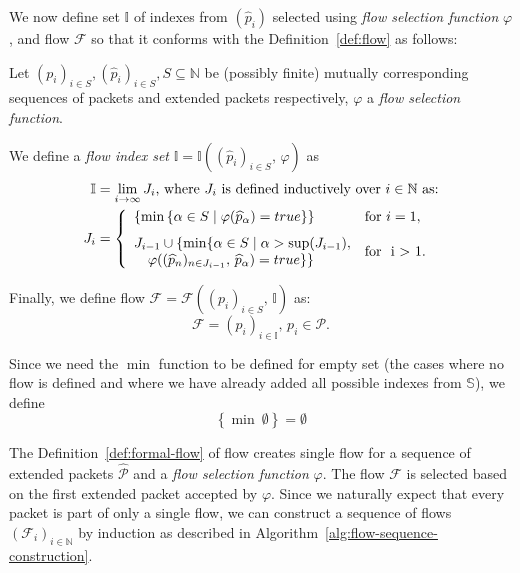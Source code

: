 We now define set $\mathbb{I}$ of indexes from $(\widehat{p}_i)$ selected using \emph{flow selection function} $\varphi$, and flow $\mathcal{F}$ so that it conforms with the Definition~\ref{def:flow} as follows:
\begin{defn}\label{def:formal-flow}
Let $(p_i)_{i \in S}, (\widehat{p}_i)_{i \in S}, S \subseteq \mathbb{N}$ be (possibly finite) mutually corresponding sequences of packets and extended packets respectively, $\varphi$ a \emph{flow selection function}.

We define a \emph{flow index set} $\mathbb{I} = \mathbb{I}\left((\widehat{p}_i)_{i \in S},\, \varphi\right)$ as 
\begin{align*}
\mathbb{I} &= \lim_{i \to \infty} J_i \text{, where } J_i \text{ is defined inductively over }i \in \mathbb{N} \text{ as:} \notag\\
J_i &= \left\{
	\begin{array}{ll}
		\left\{\min\left\{ \alpha \in S \mid \varphi(\widehat{p}_{\alpha}) = true \right\}\right\} & \text{for } i = 1 , \\[0.7em]
		J_{i-1} \cup \{\min\{ \alpha \in S \mid \alpha > \sup(J_{i-1}), & \multirow{2}{*}{\text{for } i > 1.} \\
		\quad \varphi((\widehat{p}_n)_{n\in J_{i-1}},\, \widehat{p}_{\alpha}) = true \}\} &
	\end{array}\right.
\end{align*}

Finally, we define flow $\mathcal{F} = \mathcal{F}\left((p_i)_{i \in S},\, \mathbb{I}\right)$ as:
\begin{equation*}
	\mathcal{F} = (p_i)_{i \in \mathbb{I}},\, p_i \in \mathcal{P}.
\end{equation*}

\end{defn}

Since we need the $\min$ function to be defined for empty set (the cases where no flow is defined and where we have already added all possible indexes from $\mathbb{S}$), we define
\begin{equation*}
	\left\{\min\ \emptyset \right\} = \emptyset
\end{equation*}

The Definition~\ref{def:formal-flow} of flow creates single flow for a sequence of extended packets $\widehat{\mathcal{P}}$ and a \emph{flow selection function} $\varphi$. The flow $\mathcal{F}$ is selected based on the first extended packet accepted by $\varphi$. Since we naturally expect that every packet is part of only a single flow, we can construct a sequence of flows $(\mathcal{F}_i)_{i \in \mathbb{N}}$ by induction as described in Algorithm~\ref{alg:flow-sequence-construction}.


